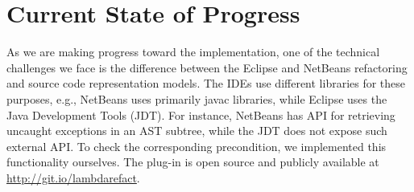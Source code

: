 \section{Current State of Progress}

As we are making progress toward the implementation, one of the technical
challenges we face is the difference between the Eclipse and NetBeans
refactoring and source code representation models. The IDEs use different
libraries for these purposes, e.g., NetBeans uses primarily javac libraries,
while Eclipse uses the Java Development Tools (JDT).  For instance, NetBeans
has API for retrieving uncaught exceptions in an AST subtree, while the JDT
does not expose such external API\@. To check the corresponding precondition,
we implemented this functionality ourselves.  The plug-in is open source and
publicly available at \url{http://git.io/lambdarefact}.
